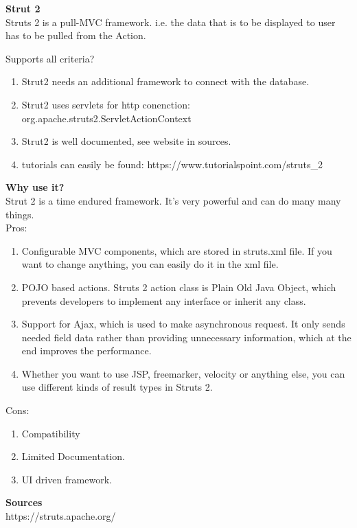 		\textbf{Strut 2} \\
		Struts 2 is a pull-MVC framework. i.e. the data that is to be displayed to user has to be pulled from the Action.
		
		Supports all criteria?\\
		\begin{enumerate}
			\item Strut2 needs an additional framework to connect with the database. 
			\item Strut2 uses servlets for http conenction: org.apache.struts2.ServletActionContext
			\item Strut2 is well documented, see website in sources.
			\item tutorials can easily be found: https://www.tutorialspoint.com/struts\_2
		\end{enumerate}

 		\textbf{Why use it?} \\
		Strut 2 is a time endured framework. It's very powerful and can do many many things. \\
		
		Pros:
		\begin{enumerate}
			\item Configurable MVC components, which are stored in struts.xml file. If you want to change anything, you can easily do it in the xml file.
			\item POJO based actions. Struts 2 action class is Plain Old Java Object, which prevents developers to implement any interface or inherit any class.
			\item Support for Ajax, which is used to make asynchronous request. It only sends needed field data rather than providing unnecessary information, which at the end improves the performance.
			\item Whether you want to use JSP, freemarker, velocity or anything else, you can use different kinds of result types in Struts 2.
		\end{enumerate}
		Cons:
		\begin{enumerate}
			\item Compatibility
			\item Limited Documentation.
			\item UI driven framework.
		\end{enumerate}
	
	\textbf{Sources}\\
	https://struts.apache.org/